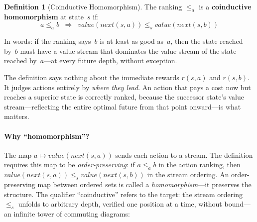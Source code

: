 \documentclass[9pt,a4paper]{article}
\theoremstyle{plain}
\theoremstyle{definition}
\newtheorem{definition}{Definition}
\theoremstyle{remark}
\begin{document}
\begin{definition}[Coinductive Homomorphism]\label{def:coind-homo}
The ranking $\le_a$ is a \textbf{coinductive homomorphism} at state~$s$ if:
\[
a \le_a b \;\;\Longrightarrow\;\; \mathit{value}(\mathit{next}(s,a)) \le_s \mathit{value}(\mathit{next}(s,b))
\]
\end{definition}

\noindent In words: if the ranking says~$b$ is at least as good as~$a$, then the state reached by~$b$ must have a value stream that dominates the value stream of the state reached by~$a$---at every future depth, without exception.

The definition says nothing about the immediate rewards $r(s,a)$ and $r(s,b)$.
It judges actions entirely by \emph{where they lead}.
An action that pays a cost now but reaches a superior state is correctly ranked, because the successor state's value stream---reflecting the entire optimal future from that point onward---is what matters.

\paragraph{Why ``homomorphism''?}
The map $a \mapsto \mathit{value}(\mathit{next}(s,a))$ sends each action to a stream.
The definition requires this map to be \emph{order-preserving}: if $a \le_a b$ in the action ranking, then $\mathit{value}(\mathit{next}(s,a)) \le_s \mathit{value}(\mathit{next}(s,b))$ in the stream ordering.
An order-preserving map between ordered sets is called a \emph{homomorphism}---it preserves the structure.
The qualifier ``coinductive'' refers to the target: the stream ordering $\le_s$ unfolds to arbitrary depth, verified one position at a time, without bound---an infinite tower of commuting diagrams:
\end{document}

